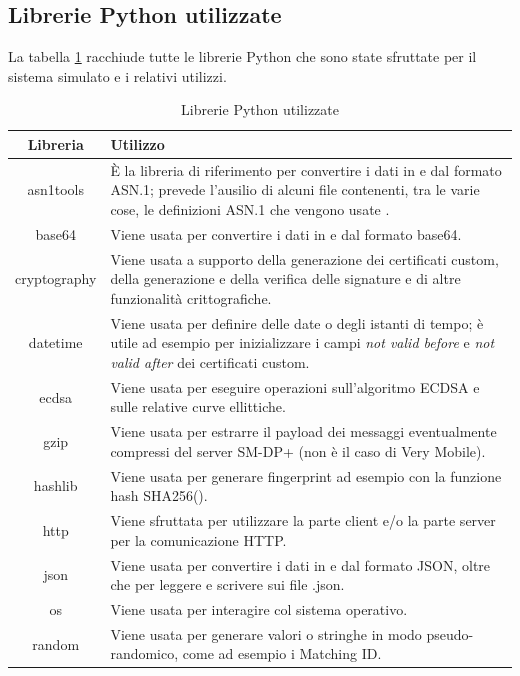 \documentclass[10pt, oneside]{book}
\begin{document}
\subsection{Librerie Python utilizzate}
La tabella \ref{tab:libraries} racchiude tutte le librerie Python che sono state sfruttate per il sistema simulato e i relativi utilizzi.\\
\begin{table}[h!]
\begin{center}
\captionsetup{skip=4pt}
\caption{Librerie Python utilizzate}
\label{tab:libraries}
\begin{tabularx}{\textwidth}{|c|X|}
\hline
\textbf{Libreria} & \textbf{Utilizzo}\\
\hline
asn1tools & È la libreria di riferimento per convertire i dati in e dal formato ASN.1; prevede l'ausilio di alcuni file contenenti, tra le varie cose, le definizioni ASN.1 che vengono usate \cite{RSP-definitions}.\\
\hline
base64 & Viene usata per convertire i dati in e dal formato base64.\\
\hline
cryptography & Viene usata a supporto della generazione dei certificati custom, della generazione e della verifica delle signature e di altre funzionalità crittografiche.\\
\hline
datetime & Viene usata per definire delle date o degli istanti di tempo; è utile ad esempio per inizializzare i campi \textit{not valid before} e \textit{not valid after} dei certificati custom.\\
\hline
ecdsa & Viene usata per eseguire operazioni sull'algoritmo ECDSA e sulle relative curve ellittiche.\\
\hline
gzip & Viene usata per estrarre il payload dei messaggi eventualmente compressi del server SM-DP+ (non è il caso di Very Mobile).\\
\hline
hashlib & Viene usata per generare fingerprint ad esempio con la funzione hash SHA256().\\
\hline
http & Viene sfruttata per utilizzare la parte client e/o la parte server per la comunicazione HTTP.\\
\hline
json & Viene usata per convertire i dati in e dal formato JSON, oltre che per leggere e scrivere sui file .json.\\
\hline
os & Viene usata per interagire col sistema operativo.\\
\hline
random & Viene usata per generare valori o stringhe in modo pseudo-randomico, come ad esempio i Matching ID.\\

\end{tabularx}
\end{center}
\end{table}
\end{document}
